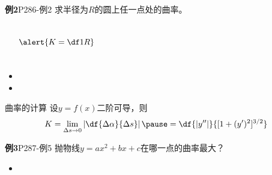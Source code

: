 \begin{frame}
	\linespread{1.2}
	\begin{exampleblock}{{\bf 例2}\hfill P286-例2}
		求半径为$R$的圆上任一点处的曲率。
	\end{exampleblock}
	\pause 
	\begin{columns}
			\begin{center}
			\end{center}
		\pause 
			$$\alert{K=\df 1R}$$
	\end{columns}
	\begin{itemize}\pause 
	  \item {}\pause 
	  \item {}
	\end{itemize}
\end{frame}

\begin{frame}{曲率的计算}
	\linespread{1.2}\pause 
	设$y=f(x)$二阶可导，则
	\alert{$$K=\lim\limits_{\Delta s\to
				0}\left|\df{\Delta\alpha}{\Delta s}\right|
				\pause =\df{|y''|}{[1+(y')^2]^{3/2}}$$}\pause 
	\begin{exampleblock}{{\bf 例3}\hfill P287-例5}
		抛物线$y=ax^2+bx+c$在哪一点的曲率最大？
	\end{exampleblock}\pause 
	\begin{itemize}
	  \item {}
	\end{itemize}
\end{frame}

